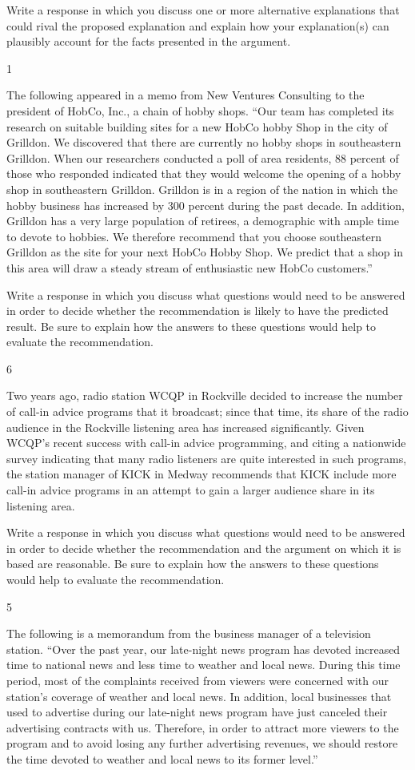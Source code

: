 \documentclass[]{article}
\begin{document}
Write a response in which you discuss one or more alternative
explanations that could rival the proposed explanation and explain how
your explanation(s) can plausibly account for the facts presented in the
argument.

1

The following appeared in a memo from New Ventures Consulting to the
president of HobCo, Inc., a chain of hobby shops. ``Our team has
completed its research on suitable building sites for a new HobCo hobby
Shop in the city of Grilldon. We discovered that there are currently no
hobby shops in southeastern Grilldon. When our researchers conducted a
poll of area residents, 88 percent of those who responded indicated that
they would welcome the opening of a hobby shop in southeastern Grilldon.
Grilldon is in a region of the nation in which the hobby business has
increased by 300 percent during the past decade. In addition, Grilldon
has a very large population of retirees, a demographic with ample time
to devote to hobbies. We therefore recommend that you choose
southeastern Grilldon as the site for your next HobCo Hobby Shop. We
predict that a shop in this area will draw a steady stream of
enthusiastic new HobCo customers.''

Write a response in which you discuss what questions would need to be
answered in order to decide whether the recommendation is likely to have
the predicted result. Be sure to explain how the answers to these
questions would help to evaluate the recommendation.

6

Two years ago, radio station WCQP in Rockville decided to increase the
number of call-in advice programs that it broadcast; since that time,
its share of the radio audience in the Rockville listening area has
increased significantly. Given WCQP's recent success with call-in advice
programming, and citing a nationwide survey indicating that many radio
listeners are quite interested in such programs, the station manager of
KICK in Medway recommends that KICK include more call-in advice programs
in an attempt to gain a larger audience share in its listening area.

Write a response in which you discuss what questions would need to be
answered in order to decide whether the recommendation and the argument
on which it is based are reasonable. Be sure to explain how the answers
to these questions would help to evaluate the recommendation.

5

The following is a memorandum from the business manager of a television
station. ``Over the past year, our late-night news program has devoted
increased time to national news and less time to weather and local news.
During this time period, most of the complaints received from viewers
were concerned with our station's coverage of weather and local news. In
addition, local businesses that used to advertise during our late-night
news program have just canceled their advertising contracts with us.
Therefore, in order to attract more viewers to the program and to avoid
losing any further advertising revenues, we should restore the time
devoted to weather and local news to its former level.''
\end{document}
